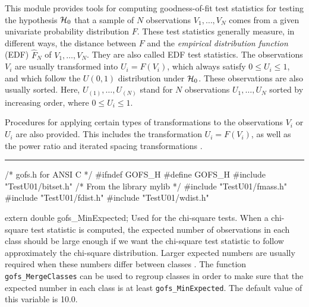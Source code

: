 
This module provides tools for computing goodness-of-fit test statistics
for testing the hypothesis $\mathcal{H}_0$ that a sample of $N$ observations 
$V_1,\dots,V_N$ comes from a given univariate probability 
distribution $F$.
These test statistics generally measure, in different ways, the
distance between $F$ and the {\em empirical distribution function\/} 
(EDF) $\hat F_N$ of $V_1,\dots,V_N$.
They are also called EDF test statistics.
The observations $V_i$ are usually transformed into $U_i = F(V_i)$,
which always satisfy $0\le U_i\le 1$, and which
follow the $U(0,1)$ distribution under $\mathcal{H}_0$.
These observations are also usually sorted.
Here, $U_{(1)}, \dots, U_{(N)}$ stand for $N$ observations
$U_1,\dots,U_N$ sorted by increasing order, where $0\le U_i\le 1$.

Procedures for applying certain types of transformations to the
observations $V_i$ or $U_i$ are also provided.
This includes the transformation $U_i = F(V_i)$, as well as 
the power ratio and iterated spacing transformations \cite{tSTE86a}.


\bigskip\hrule\medskip
\code\hide
/* gofs.h for ANSI C */
#ifndef GOFS_H
#define GOFS_H
\endhide
#include "TestU01/bitset.h"       /* From the library mylib */
#include "TestU01/fmass.h"
#include "TestU01/fdist.h"
#include "TestU01/wdist.h"
\endcode



\code


extern double gofs_MinExpected;
\endcode
  \tab  Used for the chi-square tests.
  When a chi-square test statistic is computed, the expected number
  of observations in each class should be large enough if we want
  the chi-square test statistic to follow approximately the
  chi-square distribution.  Larger expected numbers are usually
  required when these numbers differ between classes \cite{tREA88a}.
  The function {\tt gofs\_MergeClasses} can be used to regroup classes
  in order to make sure that the expected number in each class is
  at least {\tt gofs\_MinExpected}.
  The default value of this variable is 10.0.
\iffalse %
  This is for testu01:
  For some tests, the software will merge
  classes in such a way that this is always so. For others, an error
  message will be printed if this not the case (see the {\it restrictions}
  that apply for the different tests).  
\fi %
  \endtab
\ifdetailed  %
\code


